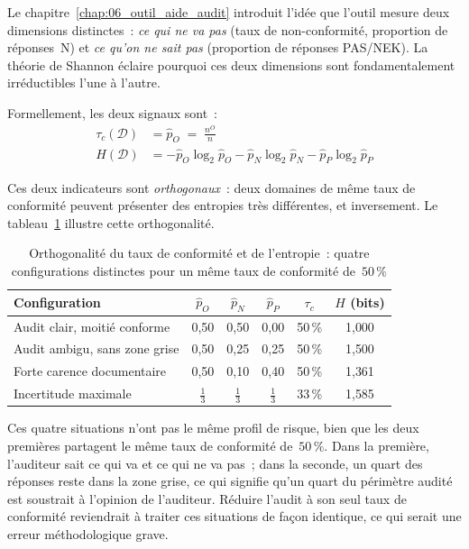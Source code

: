Le chapitre~\ref{chap:06_outil_aide_audit} introduit l'idée que l'outil mesure deux
dimensions distinctes~: \emph{ce qui ne va pas} (taux de non-conformité,
proportion de réponses~N) et \emph{ce qu'on ne sait pas} (proportion de réponses
PAS/NEK). La théorie de Shannon éclaire pourquoi ces deux dimensions sont
fondamentalement irréductibles l'une à l'autre.

Formellement, les deux signaux sont~:
\begin{align}
  \tau_c(\mathcal{D}) &= \hat{p}_O \;=\; \frac{n^O}{n}
  \label{eq:taux-conformite} \\[6pt]
  H(\mathcal{D}) &= -\hat{p}_O \log_2 \hat{p}_O
                   - \hat{p}_N \log_2 \hat{p}_N
                   - \hat{p}_P \log_2 \hat{p}_P
  \label{eq:entropie-domaine2}
\end{align}

Ces deux indicateurs sont \emph{orthogonaux}~: deux domaines de même taux de
conformité peuvent présenter des entropies très différentes, et inversement. Le
tableau~\ref{tab:ortho} illustre cette orthogonalité.

\begin{table}[H]
\centering
\small
\caption{Orthogonalité du taux de conformité et de l'entropie~: quatre
configurations distinctes pour un même taux de conformité de~$50\,\%$}
\label{tab:ortho}
\begin{tabular}{lccccc}
\toprule
\textbf{Configuration} & $\hat{p}_O$ & $\hat{p}_N$ & $\hat{p}_P$ &
$\tau_c$ & $H$ (bits) \\
\midrule
Audit clair, moitié conforme & 0{,}50 & 0{,}50 & 0{,}00 & 50\,\% & 1{,}000 \\
Audit ambigu, sans zone grise & 0{,}50 & 0{,}25 & 0{,}25 & 50\,\% & 1{,}500 \\
Forte carence documentaire & 0{,}50 & 0{,}10 & 0{,}40 & 50\,\% & 1{,}361 \\
Incertitude maximale & $\frac{1}{3}$ & $\frac{1}{3}$ & $\frac{1}{3}$ & 33\,\% & 1{,}585 \\
\bottomrule
\end{tabular}
\end{table}

Ces quatre situations n'ont pas le même profil de risque, bien que les deux
premières partagent le même taux de conformité de~$50\,\%$. Dans la première,
l'auditeur sait ce qui va et ce qui ne va pas~; dans la seconde, un quart des
réponses reste dans la zone grise, ce qui signifie qu'un quart du périmètre
audité est soustrait à l'opinion de l'auditeur. Réduire l'audit à son seul taux
de conformité reviendrait à traiter ces situations de façon identique, ce qui
serait une erreur méthodologique grave.

